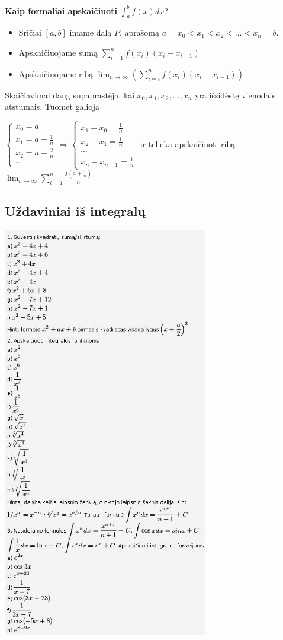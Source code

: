 \documentclass[a4paper]{article}
\begin{document}
\textbf{Kaip formaliai apskaičiuoti} $\displaystyle \int_a^b f(x)dx$?
\begin{itemize}
\item Sričiai $[a, b]$ imame dalą $P$, aprašomą $a=x_0 <  x_1 < x_2 < \dots < x_n=b$. 
\item Apskaičiuojame sumą $\displaystyle \sum_{i=1}^{n}f(x_i)(x_i-x_{i-1})$
\item Apskaičiuojame ribą $\displaystyle \lim_{n \to \infty} \left(\sum_{i=i}^{n}f(x_i)(x_i-x_{i-1})\right)$
\end{itemize}
Skaičiavimai daug supaprastėja, kai $x_0, x_1, x_2, ..., x_n$ yra išsidėstę vienodais atstumais. Tuomet galioja

$\begin{cases}x_0=a \\ x_1=a+\frac{1}{n} \\ x_2=a+\frac{2}{n} \\ \cdots \end{cases} \Rightarrow \begin{cases} x_1-x_0=\frac{1}{n} \\ x_2-x_1=\frac{1}{n} \\ \cdots \\ x_n-x_{n-1}=\frac{1}{n} \end{cases}$ ir telieka apskaičiuoti ribą $\displaystyle \lim_{n \to \infty} \sum_{i=1}^{n}\frac{f\left(a+\frac{i}{n}\right)}{n}$

\subsection{Uždaviniai iš integralų}
\includegraphics[width=0.67\textwidth]{int_uzd.jpg}
\newpage
\end{document}
